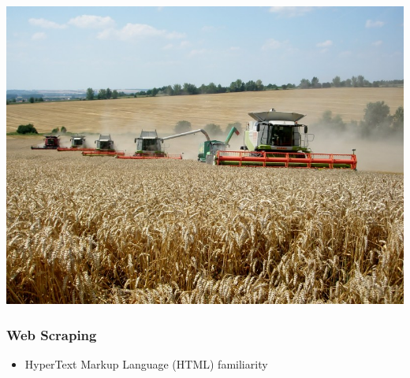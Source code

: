\documentclass[20pt]{beamer}
\begin{document}
\begin{frame}
    \vspace*{-1mm}
    \hspace*{-12mm}
    \href{http://kombajnistibrezno.wbl.sk/zatva_zapad_2011.jpg}{\includegraphics[width=1.01
\paperwidth]{zatva_zapad_2011.jpg}}
\end{frame}


\begin{frame}
	\frametitle{Web Scraping}
	\begin{itemize}
		\item 	HyperText Markup Language (HTML) familiarity
	\end{itemize}
\end{frame}
\end{document}
